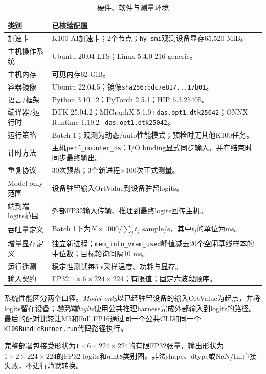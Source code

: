 \documentclass[conference]{IEEEtran}
\begin{document}
\begin{table}[t]
\caption{硬件、软件与测量环境}
\label{tab:environment_cn}
\centering
\footnotesize
\begin{tabularx}{\textwidth}{>{\raggedright\arraybackslash}p{} X}
\toprule
类别 & 已核验配置 \\
\midrule
加速卡 & K100 AI加速卡；2个节点；\texttt{hy-smi}观测设备显存65,520 MiB。 \\
主机操作系统 & Ubuntu 20.04 LTS；Linux 5.4.0-216-generic。 \\
主机内存 & 可见内存62 GiB。 \\
容器镜像 & Ubuntu 22.04.5；镜像\texttt{sha256:bdc7e817...17b01}。 \\
语言/框架 & Python 3.10.12；PyTorch 2.5.1；HIP 6.3.25405。 \\
编译器/运行时 & DTK 25.04.2；MIGraphX 5.1.0+\texttt{das.opt1.dtk25042}；ONNX Runtime 1.19.2+\texttt{das.opt1.dtk25042}。 \\
运行策略 & Batch 1；观测为动态/auto性能模式；预检时无其他K100任务。 \\
计时方法 & 主机\texttt{perf\_counter\_ns}；I/O binding显式同步输入，并在结束时同步最终输出。 \\
重复协议 & 30次预热；3个新进程$\times$100次正式测量。 \\
Model-only范围 & 设备驻留输入OrtValue到设备驻留logits。 \\
端到端logits范围 & 外部FP32输入传输、推理到最终logits回传主机。 \\
吞吐量定义 & Batch 1下为$N\times1000/\sum_j t_j$ sample/s，其中$t_j$的单位为ms。 \\
增量显存定义 & 独立新进程；\texttt{mem\_info\_vram\_used}峰值减去20个空闲基线样本的中位数；目标轮询间隔10 ms。 \\
运行遥测 & 稳定性测试每5 s采样温度、功耗与显存。 \\
输入契约 & FP32 $1\times6\times224\times224$；有限值；固定六波段顺序。 \\
\bottomrule
\end{tabularx}
\end{table}

系统性能区分两个口径。\textit{Model-only}以已经驻留设备的输入OrtValue为起点，并将logits留在设备；\textit{端到端logits}使用公共推理harness完成外部输入到logits的路径。最后的配对比较让M5和Full FP16通过同一个公共CLI和同一个\texttt{K100BundleRunner.run}代码路径执行。

完整部署包接受形状为$1\times6\times224\times224$的有限FP32张量，输出形状为$1\times2\times224\times224$的FP32 logits和uint8类别图。非法shape、dtype或NaN/Inf直接失败，不进行静默转换。
\end{document}
